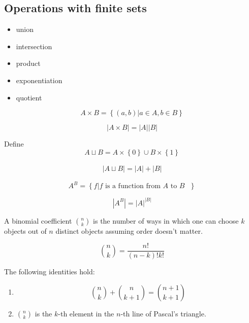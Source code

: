 \documentclass[../main.tex]{subfiles}
\begin{document}
\subsection{Operations with finite sets}
\begin{itemize}
\item union
\item intersection
\item product
\item exponentiation
\item quotient
\end{itemize}
\begin{defn}\label{defn:Cartesion productcartesion_product}
	 \[ 
		 A \times B = \left\{ ( a,b) | a \in A, b \in B \right\} 
	\]
	
\end{defn}
\begin{thm}
\[ 
|A\times B| = |A| |B|
\]

\end{thm}
\begin{defn}\label{defn:Disjoint uniondisjoint_union}
	Define 
	\[ 
	A \sqcup B = A \times \left\{ 0 \right\} \cup B \times \left\{ 1 \right\} 
	\]
			
\end{defn}
\begin{thm}
	\begin{align*}
	|A \sqcup B| = |A| + |B|
	\end{align*}
\end{thm}
\begin{defn}
	 \[ 
	A ^{B} = \left\{ f| f \text{ is a function from $A$ to $B$ }  \right\} 
	\]
\end{defn}
\begin{thm}
\[ 
|A ^{B}| = |A| ^{|B|}
\]

\end{thm}
\begin{defn}\label{defn:Binomial coefficientbinomial_coefficient}
	A binomial coefficient $\binom n k$ is the number of ways in which one can choose $k$ objects out of $n$ distinct objects assuming order doesn't matter.	
\end{defn}
\begin{propo}
	 \[ 
		 \binom n k = \frac{n!}{( n-k) ! k!}
	\]
	
\end{propo}
\begin{propo}
The following identities hold:
\begin{enumerate}
\item 
	\[ 
	\binom n k +  \binom n { k+1} = \binom { n+1} { k+1} 
	\]

\item $\binom n k$ is the $k$-th element in the $n$-th line of Pascal's triangle.
	
\end{enumerate}
\end{propo}
\end{document}
